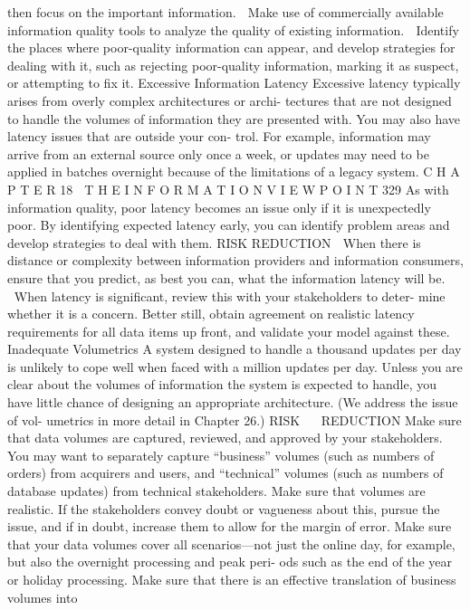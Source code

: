 then focus on the important information.
 Make use of commercially available information quality tools to analyze
the quality of existing information.
 Identify the places where poor-quality information can appear, and
develop strategies for dealing with it, such as rejecting poor-quality
information, marking it as suspect, or attempting to fix it.
Excessive Information Latency
Excessive latency typically arises from overly complex architectures or archi-
tectures that are not designed to handle the volumes of information they are
presented with. You may also have latency issues that are outside your con-
trol. For example, information may arrive from an external source only once a
week, or updates may need to be applied in batches overnight because of the
limitations of a legacy system.
C H A P T E R 18  T H E I N F O R M A T I O N V I E W P O I N T
 329
As with information quality, poor latency becomes an issue only if it is
unexpectedly poor. By identifying expected latency early, you can identify
problem areas and develop strategies to deal with them.
RISK REDUCTION
 When there is distance or complexity between information providers and
information consumers, ensure that you predict, as best you can, what
the information latency will be.
When latency is significant, review this with your stakeholders to deter-
mine whether it is a concern.
Better still, obtain agreement on realistic latency requirements for all
data items up front, and validate your model against these.
Inadequate Volumetrics
A system designed to handle a thousand updates per day is unlikely to cope
well when faced with a million updates per day. Unless you are clear about
the volumes of information the system is expected to handle, you have little
chance of designing an appropriate architecture. (We address the issue of vol-
umetrics in more detail in Chapter 26.)
RISKREDUCTION
Make sure that data volumes are captured, reviewed, and approved by
your stakeholders. You may want to separately capture “business”
volumes (such as numbers of orders) from acquirers and users, and
“technical” volumes (such as numbers of database updates) from
technical stakeholders.
Make sure that volumes are realistic. If the stakeholders convey doubt or
vagueness about this, pursue the issue, and if in doubt, increase them to
allow for the margin of error.
Make sure that your data volumes cover all scenarios—not just the
online day, for example, but also the overnight processing and peak peri-
ods such as the end of the year or holiday processing.
Make sure that there is an effective translation of business volumes into
